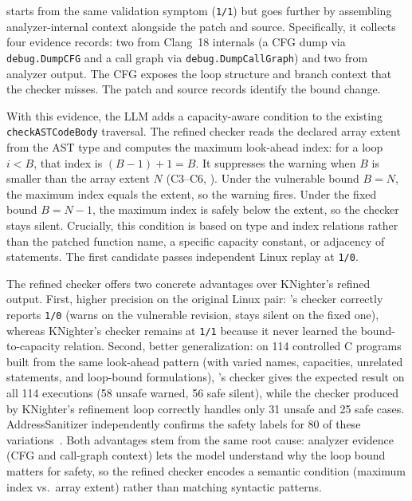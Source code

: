 \toolname starts from the same validation symptom (\texttt{1/1}) but goes further by assembling analyzer-internal context alongside the patch and source.
Specifically, it collects four evidence records: two from Clang~18 internals (a CFG dump via \texttt{debug.DumpCFG} and a call graph via \texttt{debug.DumpCallGraph}) and two from analyzer output.
The CFG exposes the loop structure and branch context that the checker misses. The patch and source records identify the bound change.

With this evidence, the LLM adds a capacity-aware condition to the existing \lstinline|checkASTCodeBody| traversal.
The refined checker reads the declared array extent from the AST type and computes the maximum look-ahead index: for a loop $i<B$, that index is $(B-1)+1=B$.
It suppresses the warning when $B$ is smaller than the array extent $N$ (C3--C6, ).
Under the vulnerable bound $B=N$, the maximum index equals the extent, so the warning fires.
Under the fixed bound $B=N-1$, the maximum index is safely below the extent, so the checker stays silent.
Crucially, this condition is based on type and index relations rather than the patched function name, a specific capacity constant, or adjacency of statements.
The first candidate passes independent Linux replay at \texttt{1/0}.

The refined checker offers two concrete advantages over KNighter's refined output.
First, higher precision on the original Linux pair: \toolname's checker correctly reports \texttt{1/0} (warns on the vulnerable revision, stays silent on the fixed one), whereas KNighter's checker remains at \texttt{1/1} because it never learned the bound-to-capacity relation.
Second, better generalization: on 114 controlled C programs built from the same look-ahead pattern (with varied names, capacities, unrelated statements, and loop-bound formulations), \toolname's checker gives the expected result on all 114 executions (58 unsafe warned, 56 safe silent), while the checker produced by KNighter's refinement loop correctly handles only 31 unsafe and 25 safe cases. AddressSanitizer independently confirms the safety labels for 80 of these variations~\cite{serebryany2012asan}.
Both advantages stem from the same root cause: analyzer evidence (CFG and call-graph context) lets the model understand why the loop bound matters for safety, so the refined checker encodes a semantic condition (maximum index vs.\ array extent) rather than matching syntactic patterns.

